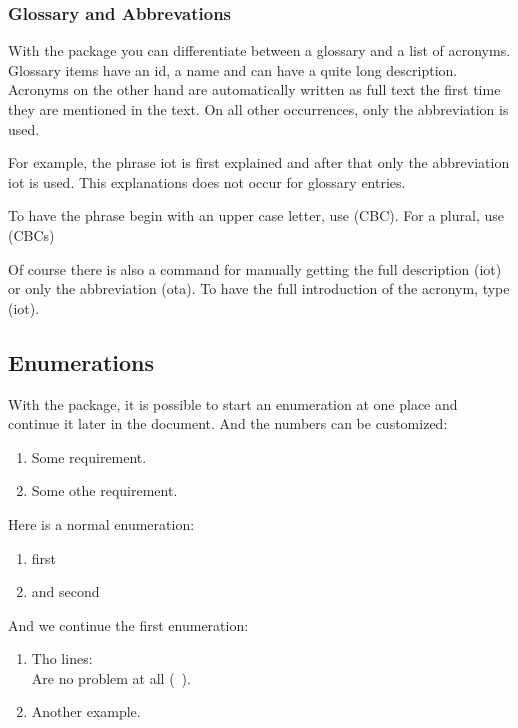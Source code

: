 \subsubsection{Glossary and Abbrevations}
With the  package you can differentiate between a glossary and a list of acronyms.
Glossary items have an id, a name and can have a quite long description.
Acronyms on the other hand are automatically written as full text the first time they are mentioned in the text.
On all other occurrences, only the abbreviation is used.



For example, the phrase \gls{iot} is first explained and after that only the abbreviation \gls{iot} is used.
This explanations does not occur for glossary entries.

To have the phrase begin with an upper case letter, use  (\Gls{CBC}).
For a plural, use  (\glspl{CBC})

Of course there is also a command for manually getting the full description  (\acrlong{iot}) or only the abbreviation  (\acrshort{ota}).
To have the full introduction of the acronym, type  (\acrfull{iot}).


\subsection{Enumerations}
With the  package, it is possible to start an enumeration at one place and continue it later in the document.
And the numbers can be customized:

\begin{enumerate}[label=\textbf{R\arabic*},rightmargin=0.7cm,series=basicreq]
\item \label{req:example1}
Some requirement.
\item \label{req:example2}
Some othe requirement.
\end{enumerate}

Here is a normal enumeration:
\begin{enumerate}
    \item first
    \item and second
\end{enumerate}

And we continue the first enumeration:
\begin{enumerate}[basicreq]
\item \label{req:example3}
Tho lines:\\
Are no problem at all (\vgl~\cite{HCL:2014}).
\item \label{req:example4}
Another example.
\end{enumerate}
